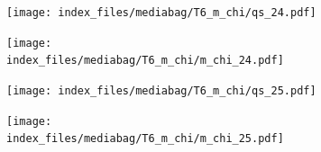 \documentclass[
  11pt,
  letterpaper,
]{scrreprt}
\begin{document}
\begin{figure}

\begin{minipage}{0.50\linewidth}

\begin{figure}[H]

{\centering \texttt{[image: index\_files/mediabag/T6\_m\_chi/qs\_24.pdf]}

}


\end{figure}%

\end{minipage}%
%
\begin{minipage}{0.50\linewidth}

\begin{figure}[H]

{\centering \texttt{[image: index\_files/mediabag/T6\_m\_chi/m\_chi\_24.pdf]}

}


\end{figure}%

\end{minipage}%

\end{figure}%

\begin{figure}

\begin{minipage}{0.50\linewidth}

\begin{figure}[H]

{\centering \texttt{[image: index\_files/mediabag/T6\_m\_chi/qs\_25.pdf]}

}


\end{figure}%

\end{minipage}%
%
\begin{minipage}{0.50\linewidth}

\begin{figure}[H]

{\centering \texttt{[image: index\_files/mediabag/T6\_m\_chi/m\_chi\_25.pdf]}

}


\end{figure}%

\end{minipage}%

\end{figure}%
\end{document}
